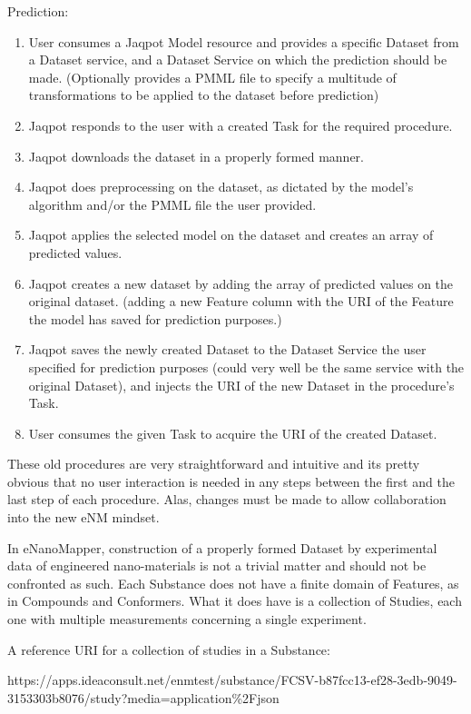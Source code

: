  
\noindent Prediction:
\begin{enumerate}
\item  User consumes a Jaqpot Model resource and provides a specific Dataset from a Dataset service, and a Dataset Service on which the prediction should be made. (Optionally provides a PMML file to specify a multitude of transformations to be applied to the dataset before prediction)
\item Jaqpot responds to the user with a created Task for the required procedure.
\item Jaqpot downloads the dataset in a properly formed manner.
\item Jaqpot does preprocessing on the dataset, as dictated by the model’s algorithm and/or the PMML file the user provided.
\item Jaqpot applies the selected model on the dataset and creates an array of predicted values.
\item Jaqpot creates a new dataset by adding the array of predicted values on the original dataset. (adding a new Feature column with the URI of the Feature the model has saved for prediction purposes.)
\item Jaqpot saves the newly created Dataset to the Dataset Service the user specified for prediction purposes (could very well be the same service with the original Dataset), and injects the URI of the new Dataset in the procedure’s Task.
\item User consumes the given Task to acquire the URI of the created Dataset.
\end{enumerate}

These old procedures are very straightforward and intuitive and its pretty 
obvious that no user interaction is needed in any steps between the first 
and the last step of each procedure. Alas, changes must be made to allow 
collaboration into the new eNM mindset.


In eNanoMapper, construction of a properly formed Dataset by experimental 
data of engineered nano-materials is not a trivial matter and should not be 
confronted as such. Each Substance does not have a finite domain of Features, 
as in Compounds and Conformers. What it does have is a collection of Studies, 
each one with multiple measurements concerning a single experiment. 

A reference URI for a collection of studies in a Substance: 

https://apps.ideaconsult.net/enmtest/substance/FCSV-b87fcc13-ef28-3edb-9049-3153303b8076/study?media=application\%2Fjson